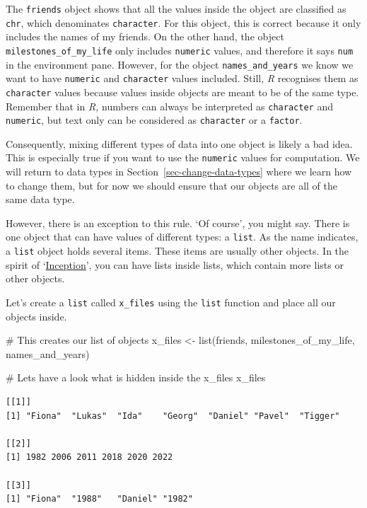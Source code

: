 \documentclass[
  letterpaper,
  DIV=11,
  numbers=noendperiod]{scrreprt}
\newenvironment{Shaded}{\begin{snugshade}}{\end{snugshade}}
\newcommand{\CommentTok}[1]{\textcolor[rgb]{0.37,0.37,0.37}{#1}}
\newcommand{\FunctionTok}[1]{\textcolor[rgb]{0.28,0.35,0.67}{#1}}
\newcommand{\NormalTok}[1]{\textcolor[rgb]{0.00,0.23,0.31}{#1}}
\newcommand{\OtherTok}[1]{\textcolor[rgb]{0.00,0.23,0.31}{#1}}
\begin{document}
The \texttt{friends} object shows that all the values inside the object
are classified as \texttt{chr}, which denominates \texttt{character}.
For this object, this is correct because it only includes the names of
my friends. On the other hand, the object
\texttt{milestones\_of\_my\_life} only includes \texttt{numeric} values,
and therefore it says \texttt{num} in the environment pane. However, for
the object \texttt{names\_and\_years} we know we want to have
\texttt{numeric} and \texttt{character} values included. Still, \emph{R}
recognises them as \texttt{character} values because values inside
objects are meant to be of the same type. Remember that in \emph{R,}
numbers can always be interpreted as \texttt{character} and
\texttt{numeric}, but text only can be considered as \texttt{character}
or a \texttt{factor}.

Consequently, mixing different types of data into one object is likely a
bad idea. This is especially true if you want to use the
\texttt{numeric} values for computation. We will return to data types in
Section~\ref{sec-change-data-types} where we learn how to change them,
but for now we should ensure that our objects are all of the same data
type.

However, there is an exception to this rule. `Of course', you might say.
There is one object that can have values of different types: a
\texttt{list}. As the name indicates, a \texttt{list} object holds
several items. These items are usually other objects. In the spirit of
`\href{https://www.imdb.com/title/tt1375666/?ref_=ext_shr_lnk}{Inception}',
you can have lists inside lists, which contain more lists or other
objects.

Let's create a \texttt{list} called \texttt{x\_files} using the
\texttt{list} function and place all our objects inside.

\begin{Shaded}
\begin{Highlighting}[]
\CommentTok{\# This creates our list of objects}
\NormalTok{x\_files }\OtherTok{\textless{}{-}} \FunctionTok{list}\NormalTok{(friends,}
\NormalTok{                milestones\_of\_my\_life,}
\NormalTok{                names\_and\_years)}

\CommentTok{\# Let\textquotesingle{}s have a look what is hidden inside the x\_files}
\NormalTok{x\_files}
\end{Highlighting}
\end{Shaded}

\begin{verbatim}
[[1]]
[1] "Fiona"  "Lukas"  "Ida"    "Georg"  "Daniel" "Pavel"  "Tigger"

[[2]]
[1] 1982 2006 2011 2018 2020 2022

[[3]]
[1] "Fiona"  "1988"   "Daniel" "1982"  
\end{verbatim}
\end{document}
